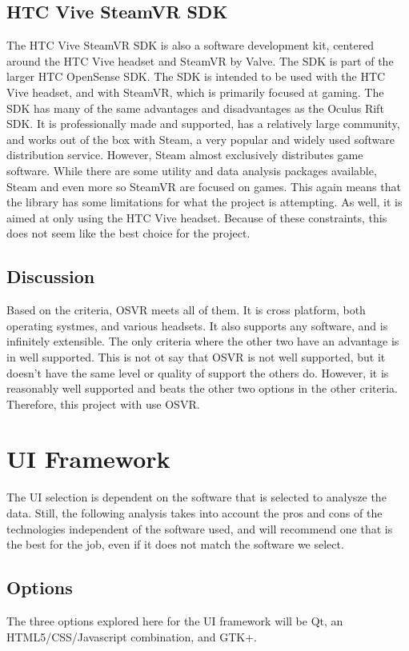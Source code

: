 \documentclass{article}
\begin{document}
\subsection{HTC Vive SteamVR SDK}

The HTC Vive SteamVR SDK is also a software development kit, centered around the HTC Vive headset
and SteamVR by Valve. The SDK is part of the larger HTC OpenSense SDK. The SDK is intended to be used
with the HTC Vive headset, and with SteamVR, which is primarily focused at gaming. The SDK has many
of the same advantages and disadvantages as the Oculus Rift SDK. It is professionally made and supported,
has a relatively large community, and works out of the box with Steam, a very popular and widely used
software distribution service. However, Steam almost exclusively distributes game software. While there
are some utility and data analysis packages available, Steam and even more so SteamVR are focused on
games. This again means that the library has some limitations for what the project is attempting. As well,
it is aimed at only using the HTC Vive headset. Because of these constraints, this does not seem like the
best choice for the project.

\subsection{Discussion}
Based on the criteria, OSVR meets all of them. It is cross platform, both operating systmes, and
various headsets. It also supports any software, and is infinitely extensible. The only criteria
where the other two have an advantage is in well supported. This is not ot say that OSVR is not
well supported, but it doesn't have the same level or quality of support the others do. However,
it is reasonably well supported and beats the other two options in the other criteria. Therefore,
this project with use OSVR.

\section{UI Framework}

The UI selection is dependent on the software that is selected to analysze the data. Still, the
following analysis takes into account the pros and cons of the technologies independent of the software
used, and will recommend one that is the best for the job, even if it does not match the software we 
select.

\subsection{Options}
The three options explored here for the UI framework will be Qt, an HTML5/CSS/Javascript combination,
and GTK+.
\end{document}
